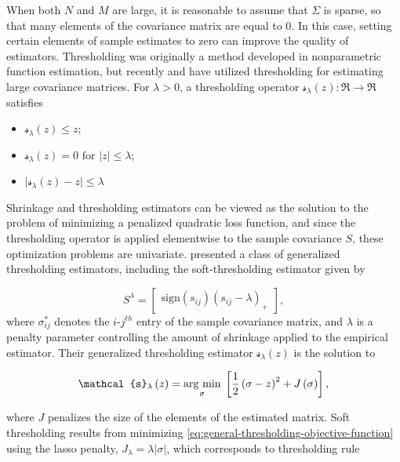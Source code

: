 When both $N$ and $M$ are large, it is reasonable to assume that $\Sigma$ is sparse, so that many elements of the covariance matrix are equal to 0. In this case, setting certain elements of sample estimates to zero can improve the quality of estimators. Thresholding was originally a method developed in nonparametric function estimation, but recently \cite{bickel2008covariance} and \cite{rothman2009generalized} have utilized thresholding for estimating large covariance matrices.  For $\lambda > 0$, a thresholding operator $\mathcal{s}_\lambda\left( z \right): \Re \rightarrow \Re$ satisfies 
\begin{itemize}
\item $\mathcal{s}_\lambda\left( z \right) \le z$;
\item $\mathcal{s}_\lambda\left( z \right) = 0 \mbox{ for } \vert z\vert \le \lambda$;
\item $\vert \mathcal{s}_\lambda\left( z \right) - z \vert \le \lambda$
\end{itemize}

Shrinkage and thresholding estimators can be viewed as the solution to the problem of minimizing a penalized quadratic loss function, and since the thresholding operator is applied elementwise to the sample covariance $S$,  these optimization problems are univariate. \cite{rothman2009generalized} presented a class of generalized thresholding estimators, including the soft-thresholding estimator given by

\[
S^{\lambda}=   \begin{bmatrix} \mbox{sign}\left(s_{ij}\right) \left(s_{ij} - \lambda\right)_+ \end{bmatrix},
\]
\noindent 
where $\sigma^*_{ij}$ denotes the $i$-$j^{th}$ entry of the sample covariance matrix, and $\lambda$ is a penalty parameter controlling the amount of shrinkage applied to the empirical estimator.  Their generalized thresholding estimator $\mathcal{s}_\lambda\left( z \right)$ is the solution to

\begin{equation} \label{eq:general-thresholding-objective-function}
\mathcal{s}_\lambda\left( z \right)  = \argmin{\sigma} \left[ \frac{1}{2} \left(\sigma - z\right)^2 + J\left(\sigma \right)\right],
\end{equation}

\noindent
where $J$ penalizes the size of the elements of the estimated matrix. Soft thresholding results from minimizing \ref{eq:general-thresholding-objective-function} using the lasso penalty, $J_\lambda = \lambda \vert \sigma \vert$, which corresponds to thresholding rule

